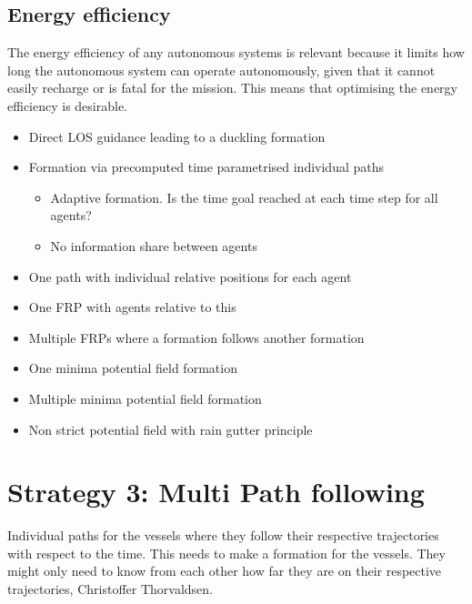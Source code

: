 \subsection{Energy efficiency}
The energy efficiency of any autonomous systems is relevant because it limits how long the autonomous system can operate autonomously, given that it cannot easily recharge or is fatal for the mission. This means that optimising the energy efficiency is desirable.

\begin{itemize}
\item Direct LOS guidance leading to a duckling formation
\item Formation via precomputed time parametrised individual paths
	\begin{itemize}
	\item Adaptive formation. Is the time goal reached at each time step for all agents?
	\item No information share between agents
	\end{itemize}
\item One path with individual relative positions for each agent
\item One \ac{FRP} with agents relative to this
\item Multiple \ac{FRP}s where a formation follows another formation
\item One minima potential field formation
\item Multiple minima potential field formation
\item Non strict potential field with rain gutter principle
\end{itemize}





\section{Strategy 3: Multi Path following}
Individual paths for the vessels where they follow their respective trajectories with respect to the time. This needs to make a formation for the vessels. They might only need to know from each other how far they are on their respective trajectories, Christoffer Thorvaldsen.



